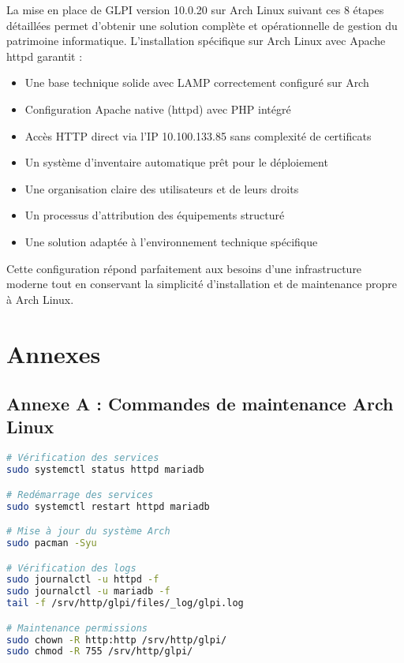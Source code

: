 \documentclass[12pt,a4paper]{article}
\begin{document}
La mise en place de GLPI version 10.0.20 sur Arch Linux suivant ces 8 étapes détaillées permet d'obtenir une solution complète et opérationnelle de gestion du patrimoine informatique. L'installation spécifique sur Arch Linux avec Apache httpd garantit :

\begin{itemize}
    \item Une base technique solide avec LAMP correctement configuré sur Arch
    \item Configuration Apache native (httpd) avec PHP intégré
    \item Accès HTTP direct via l'IP 10.100.133.85 sans complexité de certificats
    \item Un système d'inventaire automatique prêt pour le déploiement
    \item Une organisation claire des utilisateurs et de leurs droits
    \item Un processus d'attribution des équipements structuré
    \item Une solution adaptée à l'environnement technique spécifique
\end{itemize}

Cette configuration répond parfaitement aux besoins d'une infrastructure moderne tout en conservant la simplicité d'installation et de maintenance propre à Arch Linux.

\newpage
\section{Annexes}

\subsection{Annexe A : Commandes de maintenance Arch Linux}

\begin{lstlisting}[language=bash, caption=Maintenance GLPI sur Arch]
# Vérification des services
sudo systemctl status httpd mariadb

# Redémarrage des services
sudo systemctl restart httpd mariadb

# Mise à jour du système Arch
sudo pacman -Syu

# Vérification des logs
sudo journalctl -u httpd -f
sudo journalctl -u mariadb -f
tail -f /srv/http/glpi/files/_log/glpi.log

# Maintenance permissions
sudo chown -R http:http /srv/http/glpi/
sudo chmod -R 755 /srv/http/glpi/
\end{lstlisting}
\end{document}
